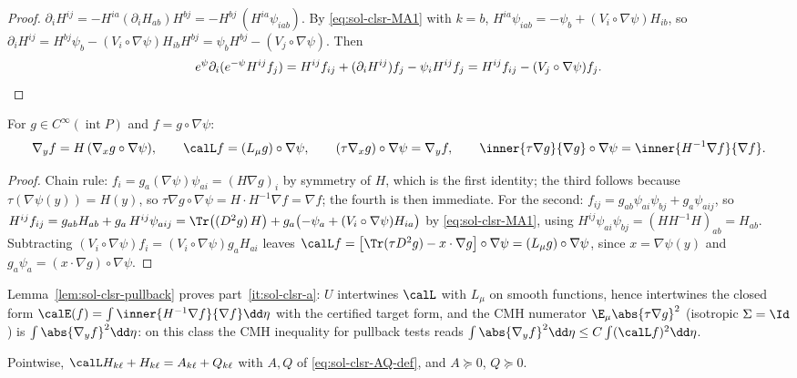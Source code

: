 \documentclass[../main.tex]{subfiles}
\begin{document}
\begin{proof}
$\partial_iH^{ij}=-H^{ia}(\partial_iH_{ab})H^{bj}=-H^{bj}\,(H^{ia}\psi_{iab})$.  By
\eqref{eq:sol-clsr-MA1} with $k=b$, $H^{ia}\psi_{iab}=-\psi_b+(V_i\circ\nabla\psi)H_{ib}$, so
$\partial_iH^{ij}=H^{bj}\psi_b-(V_i\circ\nabla\psi)H_{ib}H^{bj}=\psi_bH^{bj}-(V_j\circ\nabla\psi)$.
Then
\[
  e^{\psi}\partial_i(e^{-\psi}H^{ij}f_j)
  =H^{ij}f_{ij}+(\partial_iH^{ij})f_j-\psi_iH^{ij}f_j
  =H^{ij}f_{ij}-(V_j\circ\nabla\psi)f_j .\qedhere
\]
\end{proof}

\begin{lemma}
\label{lem:sol-clsr-pullback}
For $g\in C^\infty(\operatorname{int}P)$ and $f=g\circ\nabla\psi$:
\[
  \nabla_yf=H\,(\nabla_xg\circ\nabla\psi),\qquad
  \calL f=(L_\mu g)\circ\nabla\psi,\qquad
  (\tau\nabla_xg)\circ\nabla\psi=\nabla_yf,\qquad
  \inner{\tau\nabla g}{\nabla g}\circ\nabla\psi=\inner{H^{-1}\nabla f}{\nabla f}.
\]
\end{lemma}

\begin{proof}
Chain rule: $f_i=g_a(\nabla\psi)\psi_{ai}=(H\nabla g)_i$ by symmetry of $H$, which is the first
identity; the third follows because $\tau(\nabla\psi(y))=H(y)$, so
$\tau\nabla g\circ\nabla\psi=H\cdot H^{-1}\nabla f=\nabla f$; the fourth is then immediate.
For the second: $f_{ij}=g_{ab}\psi_{ai}\psi_{bj}+g_a\psi_{aij}$, so
$H^{ij}f_{ij}=g_{ab}H_{ab}+g_a\,H^{ij}\psi_{aij}
=\Tr\bigl((D^2g)\,H\bigr)+g_a\bigl(-\psi_a+(V_i\circ\nabla\psi)H_{ia}\bigr)$ by
\eqref{eq:sol-clsr-MA1}, using $H^{ij}\psi_{ai}\psi_{bj}=(HH^{-1}H)_{ab}=H_{ab}$.  Subtracting
$(V_i\circ\nabla\psi)f_i=(V_i\circ\nabla\psi)g_aH_{ai}$ leaves
$\calL f=\bigl[\Tr(\tau D^2g)-x\cdot\nabla g\bigr]\circ\nabla\psi=(L_\mu g)\circ\nabla\psi$,
since $x=\nabla\psi(y)$ and $g_a\psi_a=(x\cdot\nabla g)\circ\nabla\psi$.
\end{proof}

Lemma~\ref{lem:sol-clsr-pullback} proves part~\ref{it:sol-clsr-a}: $U$ intertwines $\calL$ with
$L_\mu$ on smooth functions, hence intertwines the closed form
$\calE(f)=\int\inner{H^{-1}\nabla f}{\nabla f}\dd\eta$ with the certified target form, and the
CMH numerator $\E_\mu\abs{\tau\nabla g}^2$ (isotropic $\Sigma=\Id$) is
$\int\abs{\nabla_yf}^2\dd\eta$: on this class the CMH inequality for pullback tests reads
$\int\abs{\nabla_yf}^2\dd\eta\le C\int(\calL f)^2\dd\eta$.

\begin{lemma}
\label{lem:sol-clsr-MA2}
Pointwise, $\calL H_{k\ell}+H_{k\ell}=A_{k\ell}+Q_{k\ell}$ with $A,Q$ of
\eqref{eq:sol-clsr-AQ-def}, and $A\succeq0$, $Q\succeq0$.
\end{lemma}
\end{document}
